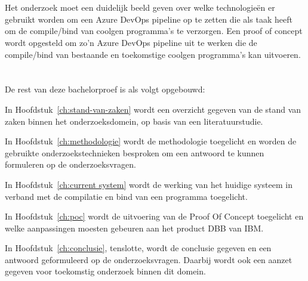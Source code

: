 \section{}%
\label{sec:onderzoeksdoelstelling}

Het onderzoek moet een duidelijk beeld geven over welke technologieën er gebruikt worden om een Azure DevOps pipeline op te zetten die als taak heeft om de compile/bind van coolgen programma's te verzorgen.
Een proof of concept wordt opgesteld om zo'n Azure DevOps pipeline uit te werken die de compile/bind van bestaande en toekomstige coolgen programma's kan uitvoeren. 

\section{}%
\label{sec:opzet-bachelorproef}

De rest van deze bachelorproef is als volgt opgebouwd:

In Hoofdstuk~\ref{ch:stand-van-zaken} wordt een overzicht gegeven van de stand van zaken binnen het onderzoeksdomein, op basis van een literatuurstudie.

In Hoofdstuk~\ref{ch:methodologie} wordt de methodologie toegelicht en worden de gebruikte onderzoekstechnieken besproken om een antwoord te kunnen formuleren op de onderzoeksvragen.

In Hoofdstuk~\ref{ch:current system} wordt de werking van het huidige systeem in verband met de compilatie en bind van een programma toegelicht. 

In Hoofdstuk~\ref{ch:poc} wordt de uitvoering van de Proof Of Concept toegelicht en welke aanpassingen moesten gebeuren aan het product DBB van IBM. 

In Hoofdstuk~\ref{ch:conclusie}, tenslotte, wordt de conclusie gegeven en een antwoord geformuleerd op de onderzoeksvragen. Daarbij wordt ook een aanzet gegeven voor toekomstig onderzoek binnen dit domein.